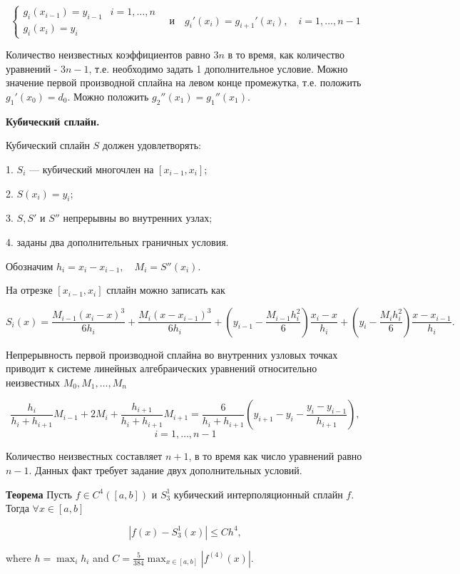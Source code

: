 $$\begin{cases} 
	g_i(x_{i-1}) = y_{i-1} & i = 1, \ldots, n \\ 
	g_i(x_i) = y_i 
\end{cases} \quad \text{и} \quad g_i'(x_i) = g_{i+1}'(x_i), \quad i = 1, \ldots, n-1$$

Количество неизвестных коэффициентов равно \(3n\) в то время, как количество уравнений - \(3n - 1\), т.е. необходимо задать 1 дополнительное условие.  
Можно значение первой производной сплайна на левом конце промежутка, т.е. положить \(g_1'(x_0) = d_0\). Можно положить \(g_2''(x_1) = g_1''(x_1)\). 

\textbf{Кубический сплайн.}

Кубический сплайн \( S \) должен удовлетворять:

1. \( S_i \) — кубический многочлен на \([x_{i-1}, x_i]\);

2. \( S(x_i) = y_i\);

3. \( S, S' \) и \( S'' \) непрерывны во внутренних узлах;

4. заданы два дополнительных граничных условия.

Обозначим $h_i = x_i - x_{i-1}, \quad M_i = S''(x_i).$

На отрезке \([x_{i-1}, x_i]\) сплайн можно записать как

$$S_i(x) = \frac{M_{i-1}(x_i - x)^3}{6h_i} + \frac{M_i(x - x_{i-1})^3}{6h_i} + \left( y_{i-1} - \frac{M_{i-1}h_i^2}{6} \right) \frac{x_i - x}{h_i} + \left( y_i - \frac{M_i h_i^2}{6} \right) \frac{x - x_{i-1}}{h_i}.$$

Непрерывность первой производной сплайна во внутренних узловых точках  
приводит к системе линейных алгебраических уравнений относительно неизвестных \(M_0, M_1, \dots, M_n\)  

$$\frac{h_i}{h_i + h_{i+1}} M_{i-1} + 2M_i + \frac{h_{i+1}}{h_i + h_{i+1}} M_{i+1} = \frac{6}{h_i + h_{i+1}} \left( y_{i+1} - y_i - \frac{y_i - y_{i-1}}{h_{i+1}} \right),$$
$$i = 1, \dots, n - 1$$

Количество неизвестных составляет \(n+1\), в то время как число уравнений равно \(n-1\). Данных факт требует задание двух дополнительных условий.

\dotfill

\textbf{Теорема}
Пусть \( f \in C^4([a, b]) \) и \( S_3^1 \) кубический интерполяционный сплайн \( f \). Тогда \( \forall x \in [a, b] \)

$$|f(x) - S_3^1(x)| \leq Ch^4,$$

where \( h = \max_i h_i \) and \( C = \frac{5}{384} \max_{x \in [a, b]} |f^{(4)}(x)| \).

